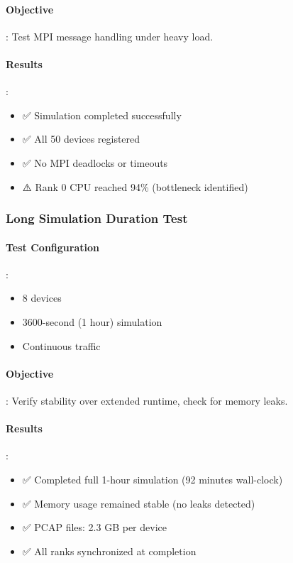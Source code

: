\paragraph{Objective}:
Test MPI message handling under heavy load.

\paragraph{Results}:
\begin{itemize}
    \item ✅ Simulation completed successfully
    \item ✅ All 50 devices registered
    \item ✅ No MPI deadlocks or timeouts
    \item ⚠️ Rank 0 CPU reached 94\% (bottleneck identified)
\end{itemize}

\subsubsection{Long Simulation Duration Test}

\paragraph{Test Configuration}:
\begin{itemize}
    \item 8 devices
    \item 3600-second (1 hour) simulation
    \item Continuous traffic
\end{itemize}

\paragraph{Objective}:
Verify stability over extended runtime, check for memory leaks.

\paragraph{Results}:
\begin{itemize}
    \item ✅ Completed full 1-hour simulation (92 minutes wall-clock)
    \item ✅ Memory usage remained stable (no leaks detected)
    \item ✅ PCAP files: 2.3 GB per device
    \item ✅ All ranks synchronized at completion
\end{itemize}

